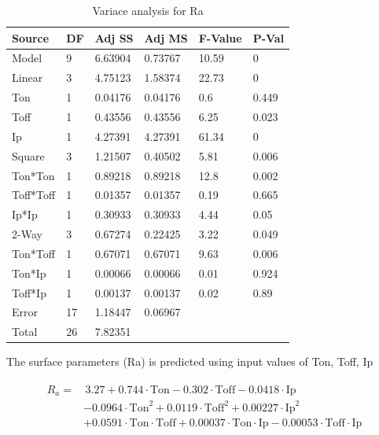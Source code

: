 \documentclass[suppldata]{interact}
\begin{document}
\begin{table}[!ht]
    \centering
      \caption{Variace analysis for Ra}
    \begin{tabular}{|l|l|l|l|l|l|}
    \hline
       Source & DF & Adj SS & Adj MS & F-Value & P-Val \\ \hline
        Model & 9 & 6.63904 & 0.73767 & 10.59 & 0 \\ \hline
        Linear & 3 & 4.75123 & 1.58374 & 22.73 & 0 \\ \hline
        Ton & 1 & 0.04176 & 0.04176 & 0.6 & 0.449 \\ \hline
        Toff & 1 & 0.43556 & 0.43556 & 6.25 & 0.023 \\ \hline
         Ip & 1 & 4.27391 & 4.27391 & 61.34 & 0 \\ \hline
        Square & 3 & 1.21507 & 0.40502 & 5.81 & 0.006 \\ \hline
        Ton*Ton & 1 & 0.89218 & 0.89218 & 12.8 & 0.002 \\ \hline
        Toff*Toff & 1 & 0.01357 & 0.01357 & 0.19 & 0.665 \\ \hline
        Ip*Ip & 1 & 0.30933 & 0.30933 & 4.44 & 0.05 \\ \hline
        2-Way & 3 & 0.67274 & 0.22425 & 3.22 & 0.049 \\ \hline
        Ton*Toff & 1 & 0.67071 & 0.67071 & 9.63 & 0.006 \\ \hline
        Ton*Ip & 1 & 0.00066 & 0.00066 & 0.01 & 0.924 \\ \hline
        Toff*Ip & 1 & 0.00137 & 0.00137 & 0.02 & 0.89 \\ \hline
        Error & 17 & 1.18447 & 0.06967 &    &    \\ \hline
        Total & 26 & 7.82351 &    &    &    \\ \hline
    \end{tabular}
    \label{tab:rsmRv}
\end{table}
\newpage
The surface parameters (Ra) is predicted using input values of Ton, Toff, Ip 

\begin{align}
\begin{split}
R_a = &\, 3.27 + 0.744 \cdot \text{Ton} - 0.302 \cdot \text{Toff} - 0.0418 \cdot \text{Ip} \\
&- 0.0964 \cdot \text{Ton}^2 + 0.0119 \cdot \text{Toff}^2 + 0.00227 \cdot \text{Ip}^2 \\
&+ 0.0591 \cdot \text{Ton} \cdot \text{Toff} + 0.00037 \cdot \text{Ton} \cdot \text{Ip} - 0.00053 \cdot \text{Toff} \cdot \text{Ip}
\end{split}
\label{eq:Reqv}
\end{align}
\end{document}
